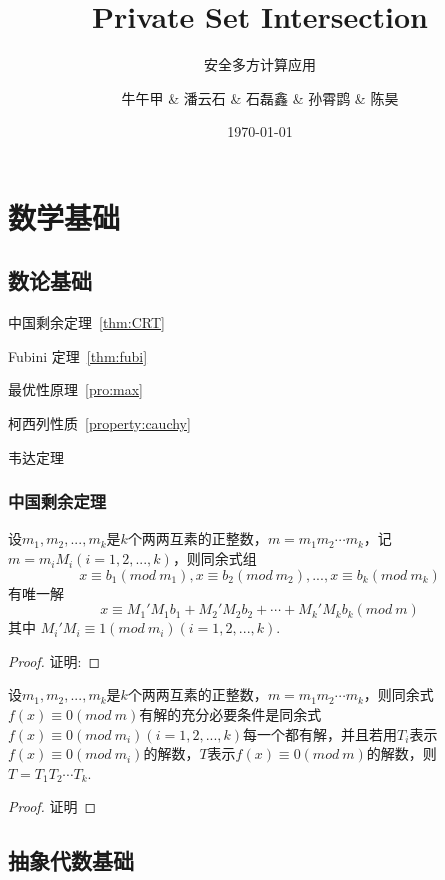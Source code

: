 \documentclass[lang=cn,newtx,10pt,scheme=chinese]{elegantbook}
\title{Private Set Intersection}
\subtitle{安全多方计算应用}
\author{牛午甲 \& 潘云石 \& 石磊鑫 \& 孙霄鹍 \& 陈昊}
\institute{USTC}
\date{\today}
\begin{document}
	
\maketitle
\frontmatter

\tableofcontents

\mainmatter
\setcounter{chapter}{-1}
\chapter{数学基础}
\section{数论基础}
\begin{introduction}
	\item 中国剩余定理~\ref{thm:CRT}
	\item Fubini 定理~\ref{thm:fubi}
	\item 最优性原理~\ref{pro:max}
	\item 柯西列性质~\ref{property:cauchy}
	\item 韦达定理
\end{introduction}
\subsection{中国剩余定理}
\begin{theorem}\label{thm:CRT}
	设$m_1, m_2,...,m_k$是$k$个两两互素的正整数，$m=m_1m_2\cdots m_k$，记$m=m_iM_i(i=1,2,...,k)$，则同余式组$$x\equiv b_1(mod\ m_1),x\equiv b_2(mod\ m_2),...,x\equiv b_k(mod\ m_k)$$
	有唯一解$$x\equiv M_1'M_1b_1+M_2'M_2b_2+\cdots+M_k'M_kb_k(mod\ m)$$
	其中 $M_i'M_i\equiv 1(mod\ m_i)(i=1,2,...,k)$.
\end{theorem}
\begin{proof}
	证明:
\end{proof}

\begin{corollary}\label{thm:EX_CRT}
	设$m_1, m_2,...,m_k$是$k$个两两互素的正整数，$m=m_1m_2\cdots m_k$，则同余式$f(x)\equiv 0(mod\ m)$有解的充分必要条件是同余式$f(x)\equiv 0(mod\ m_i)(i=1,2,...,k)$每一个都有解，并且若用$T_i$表示$f(x)\equiv 0(mod\ m_i)$的解数，$T$表示$f(x)\equiv 0(mod\ m)$的解数，则$T=T_1T_2\cdots T_k$.
\end{corollary}
\begin{proof}
	证明
\end{proof}

\section{抽象代数基础}
\end{document}
